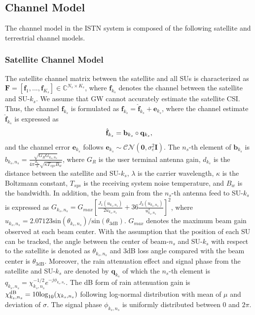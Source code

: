 \documentclass[draftclsnofoot, onecolumn, comsoc, 12pt]{IEEEtran}
\begin{document}
\subsection{Channel Model}
The channel model in the ISTN system is composed of the following satellite and terrestrial channel models.

\subsubsection{Satellite Channel Model}
The satellite channel matrix between the satellite and all SUs is characterized as $\mathbf{F}=[\mathbf{f}_{1},...,\mathbf{f}_{K_{s}}]\in \mathbb{C}^{N_{s}\times K_{s}}$, where $\mathbf{f}_{k_{s}}$ denotes the channel between the satellite and SU-$k_{s}$. 
We assume that GW cannot accurately estimate the satellite CSI. 
Thus, the channel $\mathbf{f}_{k_{s}}$ is formulated as $\mathbf{f}_{k_{s}} = \hat{\mathbf{f}}_{k_{s}} + \mathbf{e}_{k_{s}}$, where the channel estimate $\hat{\mathbf{f}}_{k_{s}}$ is expressed as 
\begin{align}
{\hat{\bf{f}}}_{k_s} = {\bf{b}}_{k_s}\circ {\bf{q}}_{k_s},
\end{align}
and the channel error $\mathbf{e}_{k_{s}}$ follows $\mathbf{e}_{k_{s}} \sim \mathcal{CN}(\mathbf{0},{\sigma}_{e}^{2}\mathbf{I})$. 
The $n_s$-th element of $\mathbf{b}_{k_{s}}$ is 
${b}_{k_s,n_s} = \frac{\sqrt{G_{R}G_{k_s,n_s}}}{4 \pi \frac{d_{k_s}}{\lambda}\sqrt{\kappa T_{sys} B_{w}}}$,
where $G_{R}$ is the user terminal antenna gain, $d_{k_{s}}$ is the distance between the satellite and SU-$k_{s}$, $\lambda$ is the carrier wavelength, $\kappa$ is the Boltzmann constant, $T_{sys}$ is the receiving system noise temperature, and $B_{w}$ is the bandwidth. 
In addition, the beam gain from the $n_{s}$-th antenna feed to SU-$k_{s}$ is expressed as ${G}_{k_s,n_s} = G_{max}\left[\frac{J_{1}(u_{k_s,n_s})}{2u_{k_s,n_s}} + 36\frac{J_{3}(u_{k_s,n_s})}{u_{k_s,n_s}^{3}}\right]^{2}$, where $u_{k_{s},n_{s}} = 2.07123 \mathrm{sin}(\theta_{k_{s},n_{s}})/\mathrm{sin}(\theta_{3\mathrm{dB}})$.
 $G_{max}$ denotes the maximum beam gain observed at each beam center.
 With the assumption that the position of each SU can be tracked, the angle between the center of beam-$n_{s}$ and SU-$k_{s}$ with respect to the satellite is denoted as $\theta_{k_{s},n_{s}}$ and 3dB loss angle compared with the beam center is $\theta_{3\mathrm{dB}}$. 
 Moreover, the rain attenuation effect and signal phase from the satellite and SU-$k_{s}$ are denoted by $\mathbf{q}_{k_{s}}$ of which the $n_{s}$-th element is ${q}_{k_s,n_s} = \chi_{k_s,n_s}^{-1/2}e^{-j\phi_{k_s,n_s}}$.
The dB form of rain attenuation gain is  $\chi_{k_{s},n_{s}}^{\rm{dB}} = 10 \mathrm{log}_{10}(\chi_{k_{s},n_{s}})$ following log-normal distribution with mean of $\mu$ and deviation of $\sigma$. The signal phase $\phi_{k_{s},n_{s}}$ is uniformly distributed between 0 and $2\pi$. 
\end{document}

